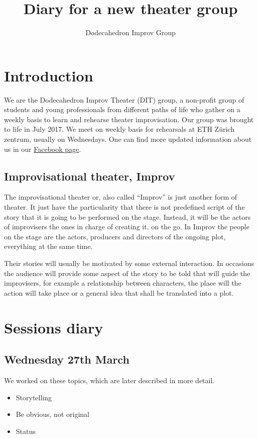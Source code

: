 \documentclass[11pt,a4paper,fleqn,twoside]{article}
\title{Diary for a new theater group}
\author{Dodecahedron Improv Group}
\begin{document}
\maketitle
\clearpage
\tableofcontents
\clearpage

\section{Introduction}

We are the Dodecahedron Improv Theater (DIT) group, a non-profit group of students and young professionals from different paths of life who gather on a weekly basis to learn and rehearse theater improvisation. Our group was brought to life in July 2017. We meet on weekly basis for rehearsals at ETH Zürich zentrum, usually on Wednesdays. One can find more updated information about us in our \href{https://www.facebook.com/dodecahedronimprovtheater/}{Facebook page}.

\subsection{Improvisational theater, Improv}

The improvisational theater or, also called ``Improv'' is just another form of theater. It just have the particularity that there is not predefined script of the story that it is going to be performed on the stage. Instead, it will be the actors of improvisers the ones in charge of creating it, on the go. In Improv the people on the stage are the actors, producers and directors of the ongoing plot, everything at the same time.

Their stories will usually be motivated by some external interaction. In occasions the audience will provide some aspect of the story to be told that will guide the improvisers, for example a relationship between characters, the place will the action will take place or a general idea that shall be translated into a plot. 

\section{Sessions diary}

\subsection{Wednesday 27th March}

We worked on these topics, which are later described in more detail.
%
\begin{itemize}
  \item Storytelling
  \item Be obvious, not original
  \item Status
\end{itemize}
\end{document}
